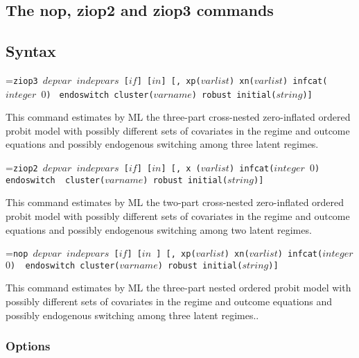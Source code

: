 \documentclass[letterpaper,fleqn,12pt]{article}
\begin{document}
\begin{onehalfspace}
\section{The nop, ziop2 and ziop3 commands}

\subsection{Syntax}


\hangindent=\parindent\noindent \texttt{ziop3 $depvar$ $indepvars$ [$if$] [$%
in$] [, xp($varlist$) xn($varlist$) infcat($integer$ $0$) }\linebreak 
\texttt{endoswitch cluster($varname$) robust initial($string$)] }

This command estimates by ML the three-part cross-nested zero-inflated
ordered probit model with possibly different sets of covariates in the
regime and outcome equations and possibly endogenous switching among three
latent regimes.

\hangindent=\parindent\noindent \texttt{ziop2 $depvar$ $indepvars$ [$if$] [$%
in$] [, x ($varlist$) infcat($integer$ $0$) endoswitch }\linebreak \texttt{%
cluster($varname$) robust initial($string$)] }

This command estimates by ML the two-part cross-nested zero-inflated ordered
probit model with possibly different sets of covariates in the regime and
outcome equations and possibly endogenous switching among two latent regimes.

\hangindent=\parindent\noindent \texttt{nop $depvar$ $indepvars$ [$if$] [$in$%
] [, xp($varlist$) xn($varlist$) infcat($integer$ $0$) }\linebreak \texttt{%
endoswitch cluster($varname$) robust initial($string$)] }

This command estimates by ML the three-part nested ordered probit model with
possibly different sets of covariates in the regime and outcome equations
and possibly endogenous switching among three latent regimes..


\subsubsection*{Options}


\end{onehalfspace}
\end{document}
